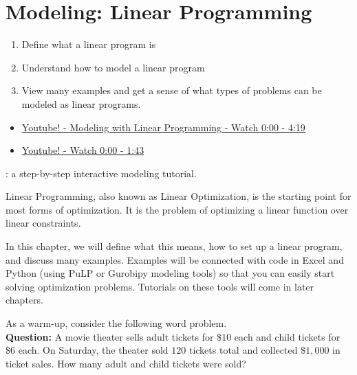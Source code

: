 
\chapter{Modeling: Linear Programming}

\begin{outcome}
\begin{enumerate}
\item Define what a linear program is
\item Understand how to model a linear program
\item View many examples and get a sense of what types of problems can be modeled as linear programs.
\end{enumerate}
\end{outcome}
\begin{resource}
\begin{itemize}
\item \href{https://www.youtube.com/watch?v=K7TL5NMlKIk&ab_channel=Dr.TreforBazett}{Youtube! - Modeling with Linear Programming - Watch 0:00 - 4:19}
\item \href{https://www.youtube.com/watch?v=E72DWgKP_1Y&t=1014s&ab_channel=TomS}{Youtube! - Watch 0:00 - 1:43}
\end{itemize}
\end{resource}

\begin{tryit}
: a step-by-step interactive modeling tutorial.
\end{tryit}


Linear Programming, also known as Linear Optimization, is the starting point for most forms of optimization.  It is the problem of optimizing a linear function over linear constraints.   

In this chapter, we will define what this means, how to set up a linear program, and discuss many examples.   Examples will be connected with code in Excel and Python (using PuLP or Gurobipy modeling tools) so that you can easily start solving optimization problems.   Tutorials on these tools will come in later chapters.

As a warm-up, consider the following word problem.\\
\noindent \textbf{Question:} A movie theater sells adult tickets for $\$10$ each and child tickets for $\$6$ each. On Saturday, the theater sold $120$ tickets total and collected $\$1{,}000$ in ticket sales. How many adult and child tickets were sold?

